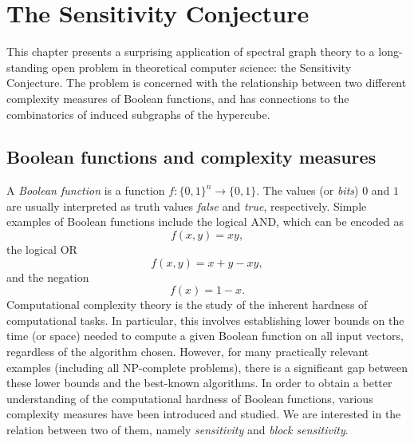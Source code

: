 \chapter{The Sensitivity Conjecture}

This chapter presents a surprising application of spectral graph theory to a long-standing open problem in theoretical computer science: the Sensitivity Conjecture. 
The problem is concerned with the relationship between two different complexity measures of Boolean functions, and has connections to the combinatorics of induced subgraphs of the hypercube.

\section{Boolean functions and complexity measures}
A \textit{Boolean function} is a function $f: \{0, 1\}^n \rightarrow \{0, 1 \}$.
The values (or \textit{bits}) $0$ and $1$ are usually interpreted as truth values \textit{false} and \textit{true}, respectively.
Simple examples of Boolean functions include the logical AND, which can be encoded as \begin{equation*}
    f(x, y) = xy,
\end{equation*} 
the logical OR 
\begin{equation*}
    f(x,y) = x + y - xy,
\end{equation*}
and the negation 
\begin{equation*}
    f(x) = 1 - x.
\end{equation*}
Computational complexity theory is the study of the inherent hardness of computational tasks. 
In particular, this involves establishing lower bounds on the time (or space) needed to compute a given Boolean function on all input vectors, regardless of the algorithm chosen. 
However, for many practically relevant examples (including all NP-complete problems), there is a significant gap between these lower bounds and the best-known algorithms.
In order to obtain a better understanding of the computational hardness of Boolean functions, various complexity measures have been introduced and studied.
%
%
%
We are interested in the relation between two of them, namely \textit{sensitivity} and \textit{block sensitivity}.

